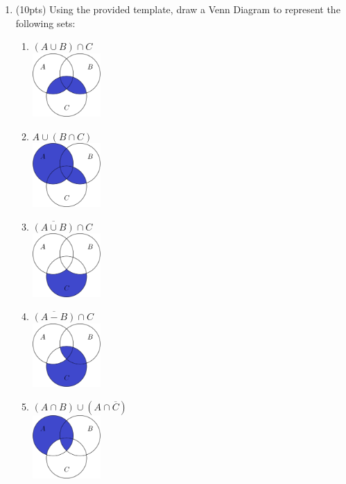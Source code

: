\documentclass{article}
\newcommand{\ov}[1]{\overline{#1}}
\begin{document}
\begin{enumerate}
 \newpage

\item(10pts) Using the provided template, draw a Venn Diagram to represent the following sets:
\begin{enumerate} 
\item $(A\cup B) \cap C$ 
\\\includegraphics[width = 0.215\textwidth]{3a.png}
\item $A\cup (B \cap C)$ 
\\\includegraphics[width = 0.215\textwidth]{3b.png}
\item $\ov{(A \cup B)} \cap C$ 
\\\includegraphics[width = 0.215\textwidth]{3c.png}
\item $\ov{(A - B)} \cap C$
\\\includegraphics[width = 0.215\textwidth]{3d.png}
\item $(A \cap B) \cup (A \cap \ov{C})$
\\\includegraphics[width = 0.215\textwidth]{3e.png}
\end{enumerate}



\end{enumerate}
\end{document}

